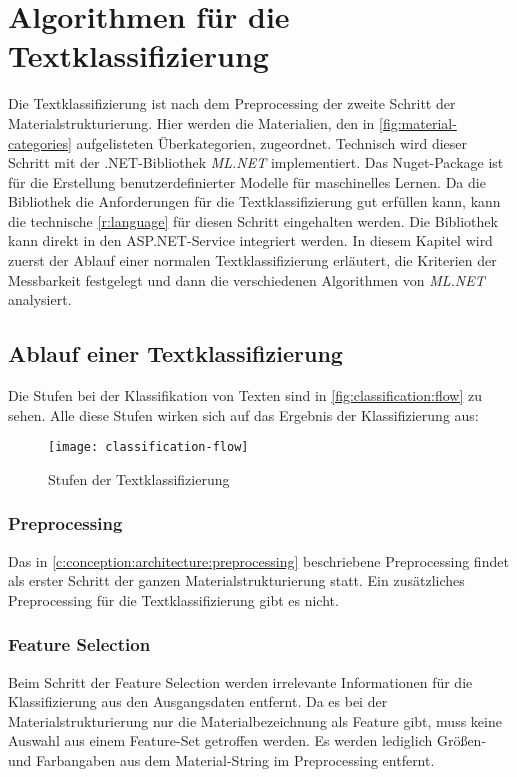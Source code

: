 \section{Algorithmen für die Textklassifizierung}
\label{c:conception:classification}
Die Textklassifizierung ist nach dem Preprocessing der zweite Schritt der Materialstrukturierung. Hier werden die Materialien, den in \autoref{fig:material-categories} aufgelisteten Überkategorien, zugeordnet.
Technisch wird dieser Schritt mit der .NET-Bibliothek \textit{ML.NET} \citep[vgl.][]{Ahmed_2019} implementiert. Das Nuget-Package ist für die Erstellung benutzerdefinierter Modelle für maschinelles Lernen. \citep[vgl.][]{mlnet_doc2022} Da die Bibliothek die Anforderungen für die Textklassifizierung gut erfüllen kann, kann die technische \autoref{r:language} für diesen Schritt eingehalten werden. Die Bibliothek kann direkt in den ASP.NET-Service integriert werden.
In diesem Kapitel wird zuerst der Ablauf einer normalen Textklassifizierung erläutert, die Kriterien der Messbarkeit festgelegt und dann die verschiedenen Algorithmen von \textit{ML.NET} analysiert.

\subsection{Ablauf einer Textklassifizierung}
\label{c:conception:classification:steps}
Die Stufen bei der Klassifikation von Texten sind in \autoref{fig:classification:flow} zu sehen. Alle diese Stufen wirken sich auf das Ergebnis der Klassifizierung aus:

\begin{figure}[h]
	\centering
	\texttt{[image: classification-flow]}
	\caption{Stufen der Textklassifizierung}
	\label{fig:classification:flow}
\end{figure}

\subsubsection{Preprocessing}
Das in \autoref{c:conception:architecture:preprocessing} beschriebene Preprocessing findet als erster Schritt der ganzen Materialstrukturierung statt. Ein zusätzliches Preprocessing für die Textklassifizierung gibt es nicht.

\subsubsection{Feature Selection}
Beim Schritt der Feature Selection werden irrelevante Informationen für die Klassifizierung aus den Ausgangsdaten entfernt. Da es bei der Materialstrukturierung nur die Materialbezeichnung als Feature gibt, muss keine Auswahl aus einem Feature-Set getroffen werden. Es werden lediglich Größen- und Farbangaben aus dem Material-String im Preprocessing entfernt.

